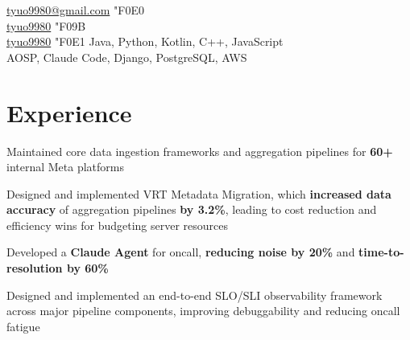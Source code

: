 \documentclass[]{peter_resume}
\begin{document}

{
    \href{mailto:tyuo9980@gmail.com}{tyuo9980@gmail.com} {\fa\char"F0E0} \\
    \href{https://github.com/tyuo9980}{tyuo9980} {\fab\char"F09B} \\
    \href{https://www.linkedin.com/in/tyuo9980}{tyuo9980} {\fab\char"F0E1}
}
{
    Java, Python, Kotlin, C++, JavaScript \\
    AOSP, Claude Code, Django, PostgreSQL, AWS
}
\sectionsep

\noindent\begin{minipage}{\textwidth}


\section{Experience}

 
\vspace{\topsep}
\begin{tightemize}
    \item Maintained core data ingestion frameworks and aggregation pipelines for \textbf{60+} internal Meta platforms
    \item Designed and implemented VRT Metadata Migration, which \textbf{increased data accuracy} of aggregation pipelines \textbf{by 3.2\%}, leading to cost reduction and efficiency wins for budgeting server resources
    \item Developed a \textbf{Claude Agent} for oncall, \textbf{reducing noise by 20\%} and \textbf{time-to-resolution by 60\%}
    \item Designed and implemented an end-to-end SLO/SLI observability framework across major pipeline components, improving debuggability and reducing oncall fatigue
\end{tightemize}
\sectionsep


\end{minipage}
\end{document}
